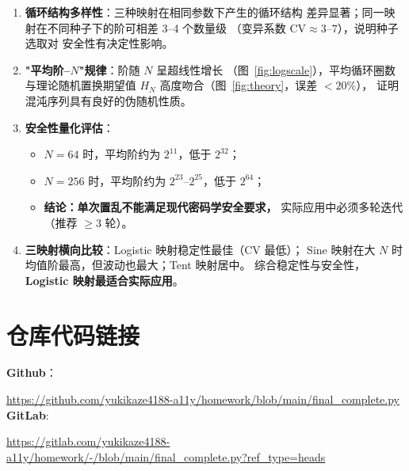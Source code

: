 \documentclass[12pt, a4paper]{article}
\begin{document}
\begin{enumerate}
  \item \textbf{循环结构多样性}：三种映射在相同参数下产生的循环结构
        差异显著；同一映射在不同种子下的阶可相差 3--4 个数量级
        （变异系数 $\mathrm{CV}\approx 3$--$7$），说明种子选取对
        安全性有决定性影响。

  \item \textbf{"平均阶–$N$"规律}：阶随 $N$ 呈超线性增长
        （图~\ref{fig:logscale}），平均循环圈数与理论随机置换期望值
        $H_N$ 高度吻合（图~\ref{fig:theory}，误差 $<20\%$），
        证明混沌序列具有良好的伪随机性质。

  \item \textbf{安全性量化评估}：
    \begin{itemize}
      \item $N=64$ 时，平均阶约为 $2^{11}$，低于 $2^{32}$；
      \item $N=256$ 时，平均阶约为 $2^{23}$--$2^{25}$，低于 $2^{64}$；
      \item \textbf{结论：单次置乱不能满足现代密码学安全要求，}
            实际应用中必须多轮迭代（推荐 $\geq 3$ 轮）。
    \end{itemize}

  \item \textbf{三映射横向比较}：Logistic 映射稳定性最佳（CV 最低）；
        Sine 映射在大 $N$ 时均值阶最高，但波动也最大；Tent 映射居中。
        综合稳定性与安全性，\textbf{Logistic 映射最适合实际应用}。
\end{enumerate}

\section{仓库代码链接}
\textbf{Github}：

\url{https://github.com/yukikaze4188-a11y/homework/blob/main/final\_complete.py}
\\
\textbf{GitLab}:

\url{https://gitlab.com/yukikaze4188-a11y/homework/-/blob/main/final_complete.py?ref_type=heads}
\end{document}
